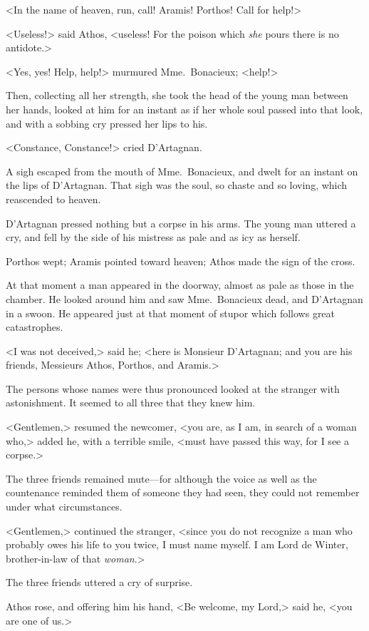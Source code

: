 <In the name of heaven, run, call! Aramis! Porthos! Call for help!> 

<Useless!> said Athos, <useless! For the poison which \emph{she} pours there is no antidote.> 

<Yes, yes! Help, help!> murmured Mme.~Bonacieux; <help!> 

Then, collecting all her strength, she took the head of the young man between her hands, looked at him for an instant as if her whole soul passed into that look, and with a sobbing cry pressed her lips to his. 

<Constance, Constance!> cried D'Artagnan. 

A sigh escaped from the mouth of Mme.~Bonacieux, and dwelt for an instant on the lips of D'Artagnan. That sigh was the soul, so chaste and so loving, which reascended to heaven. 

D'Artagnan pressed nothing but a corpse in his arms. The young man uttered a cry, and fell by the side of his mistress as pale and as icy as herself. 

Porthos wept; Aramis pointed toward heaven; Athos made the sign of the cross. 

At that moment a man appeared in the doorway, almost as pale as those in the chamber. He looked around him and saw Mme.~Bonacieux dead, and D'Artagnan in a swoon. He appeared just at that moment of stupor which follows great catastrophes. 

<I was not deceived,> said he; <here is Monsieur D'Artagnan; and you are his friends, Messieurs Athos, Porthos, and Aramis.> 

The persons whose names were thus pronounced looked at the stranger with astonishment. It seemed to all three that they knew him. 

<Gentlemen,> resumed the newcomer, <you are, as I am, in search of a woman who,> added he, with a terrible smile, <must have passed this way, for I see a corpse.> 

The three friends remained mute—for although the voice as well as the countenance reminded them of someone they had seen, they could not remember under what circumstances. 

<Gentlemen,> continued the stranger, <since you do not recognize a man who probably owes his life to you twice, I must name myself. I am Lord de Winter, brother-in-law of that \emph{woman}.> 

The three friends uttered a cry of surprise. 

Athos rose, and offering him his hand, <Be welcome, my Lord,> said he, <you are one of us.> 

